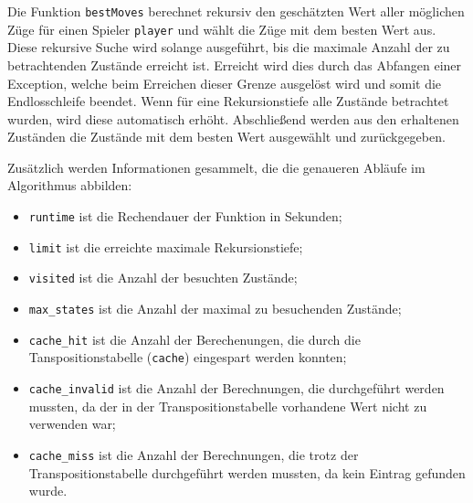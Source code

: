 \documentclass[11pt]{article}
\begin{document}
Die Funktion \texttt{bestMoves} berechnet rekursiv den geschätzten Wert
aller möglichen Züge für einen Spieler \texttt{player} und wählt die
Züge mit dem besten Wert aus. Diese rekursive Suche wird solange
ausgeführt, bis die maximale Anzahl der zu betrachtenden Zustände
erreicht ist. Erreicht wird dies durch das Abfangen einer Exception,
welche beim Erreichen dieser Grenze ausgelöst wird und somit die
Endlosschleife beendet. Wenn für eine Rekursionstiefe alle Zustände
betrachtet wurden, wird diese automatisch erhöht. Abschließend werden
aus den erhaltenen Zuständen die Zustände mit dem besten Wert ausgewählt
und zurückgegeben.

Zusätzlich werden Informationen gesammelt, die die genaueren Abläufe im
Algorithmus abbilden:

\begin{itemize}
    \item \texttt{runtime} ist die Rechendauer der Funktion in Sekunden;
    \item \texttt{limit} ist die erreichte maximale Rekursionstiefe;
    \item \texttt{visited} ist die Anzahl der besuchten Zustände;
    \item \texttt{max\_states} ist die Anzahl der maximal zu besuchenden Zustände;
    \item \texttt{cache\_hit} ist die Anzahl der Berechenungen, die durch die Tanspositionstabelle (\texttt{cache}) eingespart werden konnten;
    \item \texttt{cache\_invalid} ist die Anzahl der Berechnungen, die durchgeführt werden mussten, da der in der Transpositionstabelle vorhandene Wert nicht zu verwenden war;
    \item \texttt{cache\_miss} ist die Anzahl der Berechnungen, die trotz der Transpositionstabelle durchgeführt werden mussten, da kein Eintrag gefunden wurde.    
\end{itemize}
\end{document}
